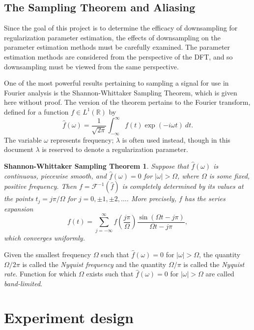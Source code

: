 \documentclass[12pt]{article}
\newtheorem*{SWST}{Shannon-Whittaker Sampling Theorem}
\begin{document}
\subsection{The Sampling Theorem and Aliasing} \label{sec:The Sampling Theorem and Aliasing}
Since the goal of this project is to determine the efficacy of downsampling for regularization parameter estimation, the effects of downsampling on the parameter estimation methods must be carefully examined. The parameter estimation methods are considered from the perspective of the DFT, and so downsampling must be viewed from the same perspective. \par 
One of the most powerful results pertaining to sampling a signal for use in Fourier analysis is the Shannon-Whittaker Sampling Theorem, which is given here without proof. The version of the theorem pertains to the Fourier transform, defined for a function $f \in L^1(\mathbb{R})$ by
\begin{equation}
\widehat{f}(\omega) = \frac{1}{\sqrt{2\pi}}\int_{-\infty}^{\infty} f(t)\exp(-i\omega{t})\: dt. 
\label{eq:FourierTransform}
\end{equation}
The variable $\omega$ represents frequency; $\lambda$ is often used instead, though in this document $\lambda$ is reserved to denote a regularization parameter. 
\begin{SWST}
Suppose that $\widehat{f}(\omega)$ is continuous, piecewise smooth, and $\widehat{f}(\omega) = 0$ for $|\omega| > \Omega$, where $\Omega$ is some fixed, positive frequency. Then $f = \mathcal{F}^{-1}(\widehat{f})$ is completely determined by its values at the points $t_j = j\pi/\Omega$ for $j = 0,\pm 1,\pm 2,\ldots$. More precisely, $f$ has the series expansion
\[f(t) = \sum_{j=-\infty}^{\infty} f\left(\frac{j\pi}{\Omega}\right)\frac{\sin(\Omega{t}-j\pi)}{\Omega{t}-j\pi},\]
which converges uniformly. 
\end{SWST}
Given the smallest frequency $\Omega$ such that $\widehat{f}(\omega) = 0$ for $|\omega| > \Omega$, the quantity $\Omega/2\pi$ is called the \textit{Nyquist frequency} and the quantity $\Omega/\pi$ is called the \textit{Nyquist rate}. Function for which $\Omega$ exists such that $\widehat{f}(\omega) = 0$ for $|\omega| > \Omega$ are called \textit{band-limited}. 


\section{Experiment design} \label{Experiment design}
\end{document}
